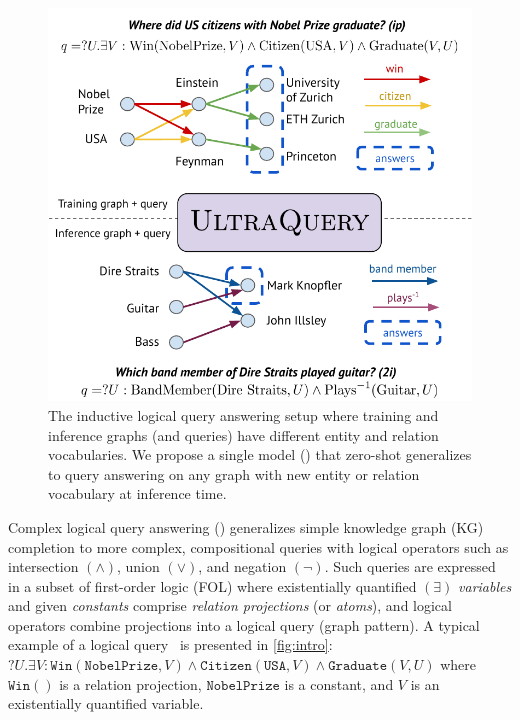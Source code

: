 \begin{figure}
\begin{minipage}{0.5\textwidth}
\vspace{-1em}
        \centering
        \includegraphics[width=\textwidth]{figs/UltraQuery_Fig1.pdf}
         \vskip -0.1in
        \caption{The inductive logical query answering setup where training and inference graphs (and queries) have different entity and relation vocabularies. We propose a single model (\method) that zero-shot generalizes to query answering %
    on any graph with new entity or relation vocabulary at inference time.}
        \label{fig:intro}
    \vspace{-1em}
\end{minipage}
\end{figure}

Complex logical query answering (\clqa) generalizes simple knowledge graph (KG) completion to more complex, compositional queries with logical operators such as intersection $(\wedge)$, union $(\lor)$, and negation $(\lnot)$.
Such queries are expressed in a subset of first-order logic (FOL) where existentially quantified $(\exists)$ \emph{variables} and given \emph{constants} comprise \emph{relation projections} (or \emph{atoms}), and logical operators combine projections into a logical query (graph pattern). 
A typical example of a logical query~\citep{ren2023ngdb} is presented in \autoref{fig:intro}: $?U.\exists V : \texttt{Win}(\texttt{NobelPrize}, V) \land \texttt{Citizen}(\texttt{USA}, V) \land \texttt{Graduate}(V, U)$ where $\texttt{Win}()$ is a relation projection, $\texttt{NobelPrize}$ is a constant, and $V$ is an existentially quantified variable.




